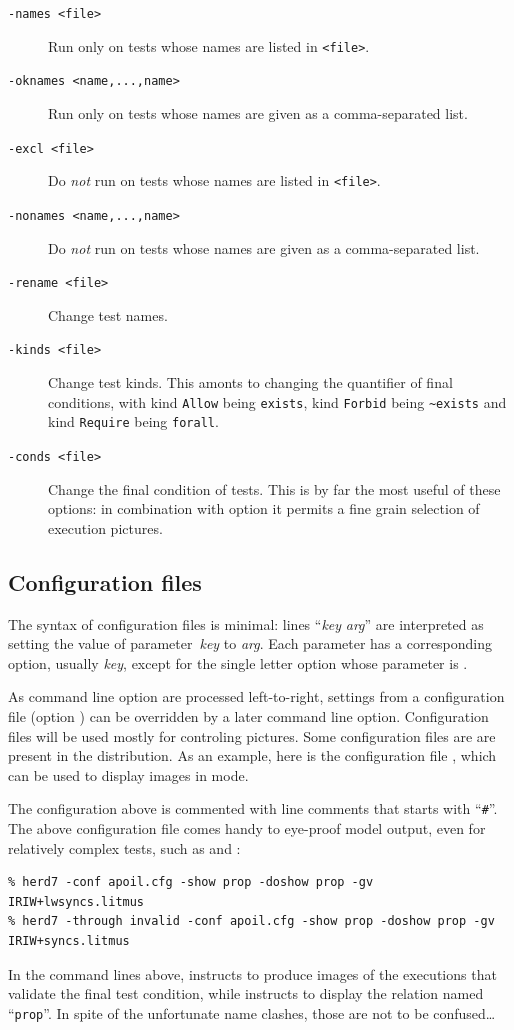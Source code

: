\begin{description}
\item[{\tt -names <file>}] Run \herd{} only on tests whose names are
listed in \texttt{<file>}.
\item[{\tt -oknames <name,...,name>}] Run \herd{} only on tests whose names are
given as a comma-separated list.
\item[{\tt -excl <file>}] Do \emph{not} run \herd{} on tests whose names are
listed in \texttt{<file>}.
\item[{\tt -nonames <name,...,name>}] Do \emph{not} run \herd{} on tests whose names are given as a comma-separated list.
\item[{\tt -rename <file>}] Change test names.
\item[{\tt -kinds <file>}] Change test kinds.
This amonts to changing the quantifier of final conditions, with
kind \texttt{Allow} being \verb+exists+,
kind \texttt{Forbid} being \verb+~exists+
and kind \texttt{Require} being \verb+forall+.
\item[{\tt -conds <file>}] Change the final condition of tests.
This is by far the most useful of these options:
in combination with option  it permits a fine grain
selection of execution pictures.
\end{description}

\subsection{\label{herd:configfile}{Configuration files}}
The syntax of configuration files is minimal:
lines ``\textit{key} \textit{arg}'' are interpreted
as setting the value of parameter~\textit{key} to \textit{arg}.
Each parameter has a corresponding option,
usually \opt{-}\textit{key}, except for the single letter
option  whose parameter is .

As command line option are processed left-to-right,
settings from a configuration file (option )
can be overridden by a later command line option.
Configuration files will be used mostly for controling pictures.
Some configuration files are
are present in the distribution.
As an example, here is the configuration file ,
which can be used to display images in  mode.

The configuration above is commented with line comments that starts
with ``\verb+#+''.
The above configuration file comes handy to eye-proof model output,
even for relatively complex tests, such as 
and :
\begin{verbatim}
% herd7 -conf apoil.cfg -show prop -doshow prop -gv IRIW+lwsyncs.litmus
% herd7 -through invalid -conf apoil.cfg -show prop -doshow prop -gv IRIW+syncs.litmus
\end{verbatim}
In the command lines above, 
instructs \herd{} to produce images of the executions that validate
the final test condition, while 
instructs \herd{} to display the relation named ``\texttt{prop}''.
In spite of the unfortunate name clashes, those are not to be confused\ldots

